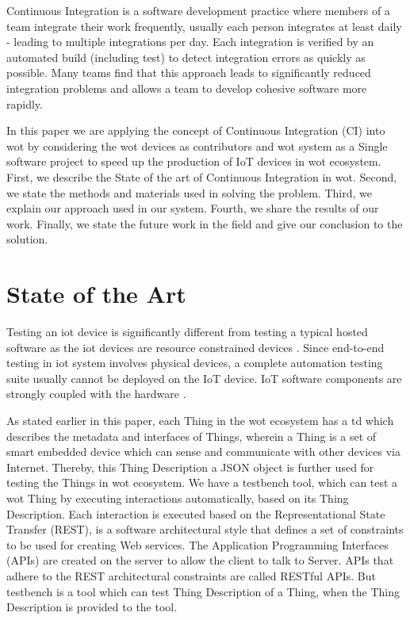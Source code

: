 \documentclass[conference]{IEEEtran}
\theoremstyle{definition}
\begin{document}
Continuous Integration is a software development practice where members of a team integrate their work frequently, usually each person integrates at least daily - leading to multiple integrations per day. 
Each integration is verified by an automated build (including test) to detect integration errors as quickly as possible. Many teams find that this approach leads to significantly reduced integration problems and allows a team to develop cohesive software more rapidly.\cite{fowler2006continuous}

In this paper we are applying the concept of Continuous Integration (CI) into \ac{wot} by considering the \ac{wot} devices as contributors and \ac{wot} system as a Single software project to speed up the production of IoT devices in \ac{wot} ecosystem. 
First, we describe the State of the art of Continuous Integration in \ac{wot}. 
Second, we state the methods and materials used in solving the problem. 
Third, we explain our approach used in our system. 
Fourth, we share the results of our work. Finally, we state the future work in the field and give our conclusion to the solution.

\section{State of the Art}

Testing an \ac{iot} device is significantly different from testing a typical hosted software as the \ac{iot} devices are resource constrained devices \cite{bormann2014terminology}. 
Since end-to-end testing in \ac{iot} system involves physical devices, a complete automation testing suite usually cannot be deployed on the IoT device. 
IoT software components are strongly coupled with the hardware \cite{rosenkranz2015distributed}.

As stated earlier in this paper, each Thing in the \ac{wot} ecosystem has a \ac{td} which describes the metadata and interfaces of Things, wherein a Thing is a set of smart embedded device which can sense and communicate with other devices via Internet. 
Thereby, this Thing Description a JSON object is further used for testing the Things in \ac{wot} ecosystem. 
We have a testbench tool, which can test a \ac{wot} Thing by executing interactions automatically, based on its Thing Description. 
Each interaction is executed based on the Representational State Transfer (REST), is a software architectural style that defines a set of constraints to be used for creating Web services. 
The Application Programming Interfaces (APIs) are created on the server to allow the client to talk to Server. APIs that adhere to the REST architectural constraints are called RESTful APIs. 
But testbench is a tool which can test Thing Description of a Thing, when the Thing Description is provided to the tool.
\end{document}

